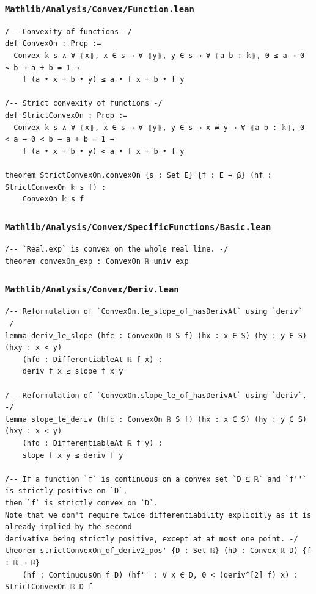\subsubsection{\texttt{Mathlib/Analysis/Convex/Function.lean}}
\begin{lstlisting}[language=lean]
/-- Convexity of functions -/
def ConvexOn : Prop :=
  Convex 𝕜 s ∧ ∀ ⦃x⦄, x ∈ s → ∀ ⦃y⦄, y ∈ s → ∀ ⦃a b : 𝕜⦄, 0 ≤ a → 0 ≤ b → a + b = 1 →
    f (a • x + b • y) ≤ a • f x + b • f y

/-- Strict convexity of functions -/
def StrictConvexOn : Prop :=
  Convex 𝕜 s ∧ ∀ ⦃x⦄, x ∈ s → ∀ ⦃y⦄, y ∈ s → x ≠ y → ∀ ⦃a b : 𝕜⦄, 0 < a → 0 < b → a + b = 1 →
    f (a • x + b • y) < a • f x + b • f y

theorem StrictConvexOn.convexOn {s : Set E} {f : E → β} (hf : StrictConvexOn 𝕜 s f) :
    ConvexOn 𝕜 s f
\end{lstlisting}

\subsubsection{\texttt{Mathlib/Analysis/Convex/SpecificFunctions/Basic.lean}}
\begin{lstlisting}[language=lean]
/-- `Real.exp` is convex on the whole real line. -/
theorem convexOn_exp : ConvexOn ℝ univ exp
\end{lstlisting}

\newpage
\subsubsection{\texttt{Mathlib/Analysis/Convex/Deriv.lean}}
\begin{lstlisting}[language=lean]
/-- Reformulation of `ConvexOn.le_slope_of_hasDerivAt` using `deriv` -/
lemma deriv_le_slope (hfc : ConvexOn ℝ S f) (hx : x ∈ S) (hy : y ∈ S) (hxy : x < y)
    (hfd : DifferentiableAt ℝ f x) :
    deriv f x ≤ slope f x y

/-- Reformulation of `ConvexOn.slope_le_of_hasDerivAt` using `deriv`. -/
lemma slope_le_deriv (hfc : ConvexOn ℝ S f) (hx : x ∈ S) (hy : y ∈ S) (hxy : x < y)
    (hfd : DifferentiableAt ℝ f y) :
    slope f x y ≤ deriv f y

/-- If a function `f` is continuous on a convex set `D ⊆ ℝ` and `f''` is strictly positive on `D`,
then `f` is strictly convex on `D`.
Note that we don't require twice differentiability explicitly as it is already implied by the second
derivative being strictly positive, except at at most one point. -/
theorem strictConvexOn_of_deriv2_pos' {D : Set ℝ} (hD : Convex ℝ D) {f : ℝ → ℝ}
    (hf : ContinuousOn f D) (hf'' : ∀ x ∈ D, 0 < (deriv^[2] f) x) : StrictConvexOn ℝ D f
\end{lstlisting}


